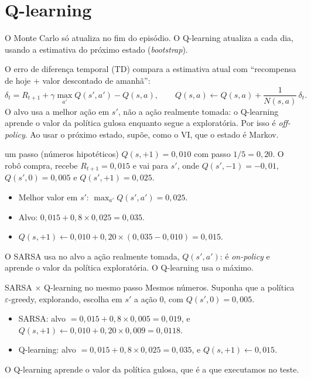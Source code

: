 \documentclass[11pt,a4paper]{article}
\newcommand{\bloco}[1]{\par\needspace{4\baselineskip}{\bfseries #1}\par\nopagebreak}
\begin{document}
\section{Q-learning}

O Monte Carlo só atualiza no fim do episódio. O Q-learning atualiza a cada dia, usando a estimativa do próximo estado (\textit{bootstrap}).

\bloco{Fórmulas}
O erro de diferença temporal (TD) compara a estimativa atual com ``recompensa de hoje + valor descontado de amanhã'':
\[
  \delta_t = R_{t+1} + \gamma \max_{a'} Q(s',a') - Q(s,a), \qquad
  Q(s,a) \leftarrow Q(s,a) + \frac{1}{N(s,a)}\,\delta_t.
\]
O alvo usa a melhor ação em $s'$, não a ação realmente tomada: o Q-learning aprende o valor da política gulosa enquanto segue a exploratória. Por isso é \textit{off-policy}. Ao usar o próximo estado, supõe, como o VI, que o estado é Markov.

\begin{exemplo}{um passo (números hipotéticos)}
$Q(s,+1) = 0{,}010$ com passo $1/5 = 0{,}20$. O robô compra, recebe $R_{t+1} = 0{,}015$ e vai para $s'$, onde $Q(s',-1) = -0{,}01$, $Q(s',0) = 0{,}005$ e $Q(s',+1) = 0{,}025$.
\begin{itemize}
  \item Melhor valor em $s'$: $\max_{a'} Q(s',a') = 0{,}025$.
  \item Alvo: $0{,}015 + 0{,}8 \times 0{,}025 = 0{,}035$.
  \item $Q(s,+1) \leftarrow 0{,}010 + 0{,}20 \times (0{,}035 - 0{,}010) = 0{,}015$.
\end{itemize}
\end{exemplo}

\bloco{SARSA $\times$ Q-learning}
O SARSA usa no alvo a ação realmente tomada, $Q(s', a')$: é \textit{on-policy} e aprende o valor da política exploratória. O Q-learning usa o máximo.

\begin{exemplo}{SARSA $\times$ Q-learning no mesmo passo}
Mesmos números. Suponha que a política $\varepsilon$-greedy, explorando, escolha em $s'$ a ação $0$, com $Q(s',0) = 0{,}005$.
\begin{itemize}
  \item SARSA: alvo $= 0{,}015 + 0{,}8 \times 0{,}005 = 0{,}019$, e $Q(s,+1) \leftarrow 0{,}010 + 0{,}20 \times 0{,}009 = 0{,}0118$.
  \item Q-learning: alvo $= 0{,}015 + 0{,}8 \times 0{,}025 = 0{,}035$, e $Q(s,+1) \leftarrow 0{,}015$.
\end{itemize}
O Q-learning aprende o valor da política gulosa, que é a que executamos no teste.
\end{exemplo}
\end{document}

